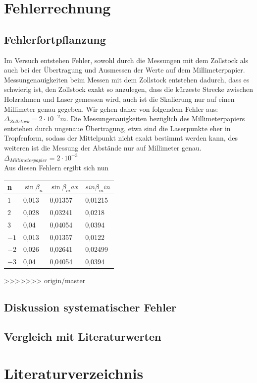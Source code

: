 \documentclass[12pt,a4paper,titlepage,headinclude,bibtotoc]{scrartcl}
\begin{document}
\par
\par
\par



\section{Fehlerrechnung}
\subsection{Fehlerfortpflanzung}
Im Versuch entstehen Fehler, sowohl durch die Messungen mit dem Zollstock als auch bei der Übertragung und Ausmessen der Werte auf dem Millimeterpapier. Messungenauigkeiten beim Messen mit dem Zollstock entstehen dadurch, dass es schwierig ist, den Zollstock exakt so anzulegen, dass die kürzeste Strecke zwischen Holzrahmen und Laser gemessen wird, auch ist die Skalierung nur auf einen Millimeter genau gegeben. Wir gehen daher von folgendem Fehler aus: $\Delta_{Zollstock}={2} \cdot{10^{-2}}m$. Die Messungenauigkeiten bezüglich des Millimeterpapiers entstehen durch ungenaue Übertragung, etwa sind die Laserpunkte eher in Tropfenform, sodass der Mittelpunkt nicht exakt bestimmt werden kann, des weiteren ist die Messung der Abstände nur auf Millimeter genau. $\Delta_{Millimeterpapier}={2} \cdot {10^{-3}}$ \\

Aus diesen Fehlern ergibt sich nun 
\par

\centering
\begin{table} [h]
\begin{tabular}{|p{2 cm}||p{3 cm}|p{3 cm}|p{3 cm}|}
		\hline
         n & $\sin\beta_n$  & $\sin\beta_max $ & $sin\beta_min$ \\
         \hline 
         $1 $& 0,013& 0,01357 & 0,01215 \\
         \hline
         $2 $& 0,028&  0,03241 &0,0218 \\
         \hline
         $3 $& 0,04& 0,04054& 0,0394\\
         \hline
         $-1$& 0,013&  0,01357& 0,0122 \\
         \hline
         $-2$& 0,026& 0,02641 & 0,02499 \\
         \hline             
         $-3$& 0,04& 0,04054  & 0,0394 \\
         \hline
\end{tabular}
\end{table}
>>>>>>> origin/master
    

\subsection{Diskussion systematischer Fehler}



\subsection{Vergleich mit Literaturwerten}

\section{Literaturverzeichnis}
\end{document}
